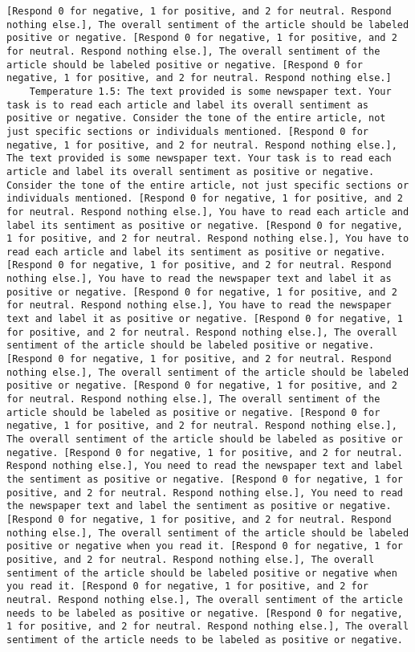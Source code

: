 \begin{lstlisting}[label=lst:poor_performing_prompts]
[Respond 0 for negative, 1 for positive, and 2 for neutral. Respond nothing else.], The overall sentiment of the article should be labeled positive or negative. [Respond 0 for negative, 1 for positive, and 2 for neutral. Respond nothing else.], The overall sentiment of the article should be labeled positive or negative. [Respond 0 for negative, 1 for positive, and 2 for neutral. Respond nothing else.]
	Temperature 1.5: The text provided is some newspaper text. Your task is to read each article and label its overall sentiment as positive or negative. Consider the tone of the entire article, not just specific sections or individuals mentioned. [Respond 0 for negative, 1 for positive, and 2 for neutral. Respond nothing else.], The text provided is some newspaper text. Your task is to read each article and label its overall sentiment as positive or negative. Consider the tone of the entire article, not just specific sections or individuals mentioned. [Respond 0 for negative, 1 for positive, and 2 for neutral. Respond nothing else.], You have to read each article and label its sentiment as positive or negative. [Respond 0 for negative, 1 for positive, and 2 for neutral. Respond nothing else.], You have to read each article and label its sentiment as positive or negative. [Respond 0 for negative, 1 for positive, and 2 for neutral. Respond nothing else.], You have to read the newspaper text and label it as positive or negative. [Respond 0 for negative, 1 for positive, and 2 for neutral. Respond nothing else.], You have to read the newspaper text and label it as positive or negative. [Respond 0 for negative, 1 for positive, and 2 for neutral. Respond nothing else.], The overall sentiment of the article should be labeled positive or negative. [Respond 0 for negative, 1 for positive, and 2 for neutral. Respond nothing else.], The overall sentiment of the article should be labeled positive or negative. [Respond 0 for negative, 1 for positive, and 2 for neutral. Respond nothing else.], The overall sentiment of the article should be labeled as positive or negative. [Respond 0 for negative, 1 for positive, and 2 for neutral. Respond nothing else.], The overall sentiment of the article should be labeled as positive or negative. [Respond 0 for negative, 1 for positive, and 2 for neutral. Respond nothing else.], You need to read the newspaper text and label the sentiment as positive or negative. [Respond 0 for negative, 1 for positive, and 2 for neutral. Respond nothing else.], You need to read the newspaper text and label the sentiment as positive or negative. [Respond 0 for negative, 1 for positive, and 2 for neutral. Respond nothing else.], The overall sentiment of the article should be labeled positive or negative when you read it. [Respond 0 for negative, 1 for positive, and 2 for neutral. Respond nothing else.], The overall sentiment of the article should be labeled positive or negative when you read it. [Respond 0 for negative, 1 for positive, and 2 for neutral. Respond nothing else.], The overall sentiment of the article needs to be labeled as positive or negative. [Respond 0 for negative, 1 for positive, and 2 for neutral. Respond nothing else.], The overall sentiment of the article needs to be labeled as positive or negative. 
\end{lstlisting}
